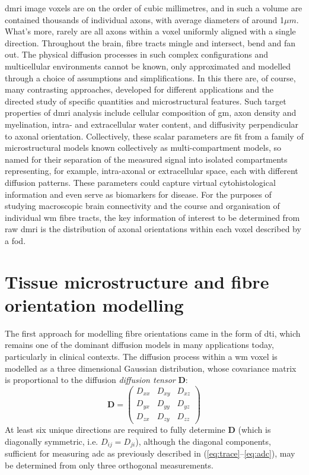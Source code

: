 \Gls{dmri} image \glspl{voxel} are on the order of cubic millimetres, and in such a volume are contained thousands of individual axons, with average diameters of around 1$\mu m$\autocite{Liewald2014,Lampinen2019}.
What's more, rarely are all axons within a voxel uniformly aligned with a single direction.
Throughout the brain, fibre tracts mingle and intersect, bend and fan out.\autocite{Jeurissen2013,Alexander2019}
The physical diffusion processes in such complex configurations and multicellular environments cannot be known, only approximated and modelled through a choice of assumptions and simplifications.
In this there are, of course, many contrasting approaches, developed for different applications and the directed study of specific quantities and microstructural features.
Such target properties of \gls{dmri} analysis include cellular composition of \gls{gm}, axon density and myelination, intra- and extracellular water content, and diffusivity perpendicular to axonal orientation.
Collectively, these scalar parameters are fit from a family of microstructural models known collectively as multi-compartment models, so named for their separation of the measured signal into isolated compartments representing, for example, intra-axonal or extracellular space, each with different diffusion patterns.\autocite{Panagiotaki2012,Alexander2019}
These parameters could capture virtual cytohistological information and even serve as biomarkers for disease\autocite{Alexander2008}.
For the purposes of studying macroscopic brain connectivity and the course and organisation of individual \gls{wm} fibre tracts, the key information of interest to be determined from raw \gls{dmri} is the distribution of axonal orientations within each voxel described by a \gls{fod}.

\section{Tissue microstructure  and fibre orientation modelling}


The first approach for modelling fibre orientations came in the form of \gls{dti}, which remains one of the dominant diffusion models in many applications today, particularly in clinical contexts.
The diffusion process within a \gls{wm} voxel is modelled as a three dimensional Gaussian distribution, whose covariance matrix is proportional to the diffusion \textit{diffusion tensor}\autocite{Basser1994,ODonnell2011} $\mathbf{D}$:
\begin{equation}
  \mathbf{D} = \begin{pmatrix}
                D_{xx} & D_{xy} & D_{xz}\\
                D_{yx} & D_{yy} & D_{yz} \\
                D_{zx} & D_{zy} & D_{zz}
                \end{pmatrix} \label{eq:dt}
\end{equation}
At least six unique directions are required to fully determine $\mathbf{D}$ (which is diagonally symmetric, i.e. $D_{ij} = D_{ji}$), although the diagonal components, sufficient for measuring \gls{adc} as previously described in (\ref{eq:trace}--\ref{eq:adc}), may be determined from only three orthogonal measurements.

